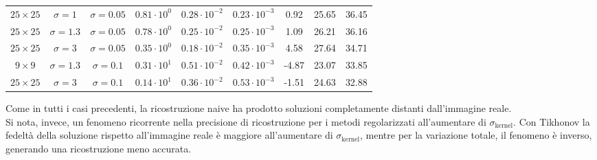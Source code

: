 \documentclass[11pt]{article}
\begin{document}
\begin{center}
\begin{tabular}{ |cc|c|c|c|c|c|c|c| }
    $25 \times 25$ & $\sigma=1$ & $\sigma=0.05$ & $0.81 \cdot 10^{0}$ & $0.28 \cdot 10^{-2}$ & $0.23 \cdot 10^{-3}$ & 0.92 & 25.65 & 36.45 \\
    $25 \times 25$ & $\sigma=1.3$ & $\sigma=0.05$ & $0.78 \cdot 10^{0}$ & $0.25 \cdot 10^{-2}$ & $0.25 \cdot 10^{-3}$ & 1.09 & 26.21 & 36.16 \\
    $25 \times 25$ & $\sigma=3$ & $\sigma=0.05$ & $0.35 \cdot 10^{0}$ & $0.18 \cdot 10^{-2}$ & $0.35 \cdot 10^{-3}$ & 4.58 & 27.64 & 34.71 \\
    \hline
	$9 \times 9$ & $\sigma=1.3$ & $\sigma=0.1$ & $0.31 \cdot 10^{1}$ & $0.51 \cdot 10^{-2}$ & $0.42 \cdot 10^{-3}$ & -4.87 & 23.07 & 33.85 \\
	$25 \times 25$ & $\sigma=3$ & $\sigma=0.1$ & $0.14 \cdot 10^{1}$ & $0.36 \cdot 10^{-2}$ & $0.53 \cdot 10^{-3}$ & -1.51 & 24.63 & 32.88 \\
    \hline
    \end{tabular}
\end{center}
Come in tutti i casi precedenti, la ricostruzione naive ha prodotto soluzioni completamente distanti dall'immagine reale.\\
Si nota, invece, un fenomeno ricorrente nella precisione di ricostruzione per i metodi regolarizzati all'aumentare di $\sigma_{\text{kernel}}$. 
Con Tikhonov la fedeltà della soluzione rispetto all'immagine reale è maggiore all'aumentare di $\sigma_{\text{kernel}}$, mentre per la variazione totale, il fenomeno è inverso, generando una ricostruzione meno accurata.
\end{document}
